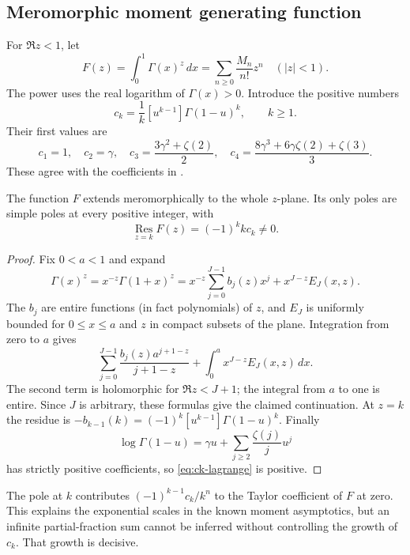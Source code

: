 \subsection{Meromorphic moment generating function}
For $\Re z<1$, let
\[
 F(z)=\int_0^1\Gamma(x)^z\,dx
     =\sum_{n\ge0}\frac{M_n}{n!}z^n\quad (|z|<1).
\]
The power uses the real logarithm of $\Gamma(x)>0$.  Introduce the positive
numbers
\begin{equation}
 c_k=\frac1k[u^{k-1}]\Gamma(1-u)^k,\qquad k\ge1.
 \label{eq:ck-lagrange}
\end{equation}
Their first values are
\[
 c_1=1,\quad c_2=\gamma,\quad
 c_3=\frac{3\gamma^2+\zeta(2)}2,\quad
 c_4=\frac{8\gamma^3+6\gamma\zeta(2)+\zeta(3)}3.
\]
These agree with the coefficients in \cite[Theorem~8.1]{ACEMKM}.

\begin{proposition}
\label{prop:moment-poles}
The function $F$ extends meromorphically to the whole $z$-plane.  Its only
poles are simple poles at every positive integer, with
\[
 \operatorname*{Res}_{z=k}F(z)=(-1)^k k c_k\ne0.
\]
\end{proposition}
\begin{proof}
Fix $0<a<1$ and expand
\[
 \Gamma(x)^z=x^{-z}\Gamma(1+x)^z
 =x^{-z}\sum_{j=0}^{J-1}b_j(z)x^j+x^{J-z}E_J(x,z).
\]
The $b_j$ are entire functions (in fact polynomials) of $z$, and $E_J$ is
uniformly bounded for $0\le x\le a$ and $z$ in compact subsets of the plane.
Integration from zero to $a$ gives
\[
 \sum_{j=0}^{J-1}\frac{b_j(z)a^{j+1-z}}{j+1-z}
 +\int_0^a x^{J-z}E_J(x,z)\,dx.
\]
The second term is holomorphic for $\Re z<J+1$; the integral from $a$ to
one is entire.  Since $J$ is arbitrary, these formulas give the claimed
continuation.  At $z=k$ the residue is
$-b_{k-1}(k)=(-1)^k[u^{k-1}]\Gamma(1-u)^k$.
Finally
\[
 \log\Gamma(1-u)=\gamma u+\sum_{j\ge2}\frac{\zeta(j)}j u^j
\]
has strictly positive coefficients, so \eqref{eq:ck-lagrange} is positive.
\end{proof}

The pole at $k$ contributes $(-1)^{k-1}c_k/k^n$ to the Taylor coefficient
of $F$ at zero.  This explains the exponential scales in the known moment
asymptotics, but an infinite partial-fraction sum cannot be inferred
without controlling the growth of $c_k$.  That growth is decisive.

